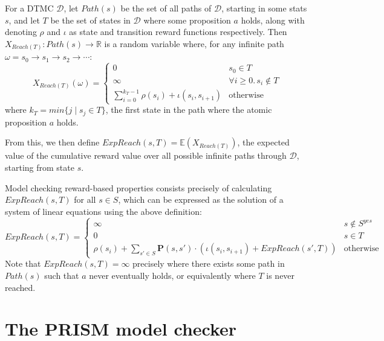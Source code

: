 \begin{definition}
\label{back:reach_reward}

For a DTMC $\mathcal{D}$, let $Path(s)$ be the set of all paths of $\mathcal{D}$, starting in some stats $s$, and let $T$ be the set of states in $\mathcal{D}$ where some proposition $a$ holds, along with denoting $\rho$ and $\iota$ as state and transition reward functions respectively. Then $X_{Reach(T)} : Path(s) \rightarrow \mathbb{R}$ is a random variable where, for any infinite path $\omega = s_{0} \rightarrow s_{1} \rightarrow s_{2} \rightarrow \cdots$:
    \begin{equation*} 
        X_{Reach(T)}(\omega) = 
            \begin{cases}
                0 & s_0 \in T \\
                \infty & \forall i \geq 0 . \, s_i \notin T  \\
                \sum_{i=0}^{k_{T} - 1} \rho(s_i) + \iota(s_i, s_{i+1}) & \text{otherwise}
            \end{cases}
    \end{equation*}
where $k_T = min \{ j \mid s_j \in T \}$, the first state in the path where the atomic proposition $a$ holds.

From this, we then define $ExpReach(s, T) = \mathbb{E}(X_{Reach(T)})$, the expected value of the cumulative reward value over all possible infinite paths through $\mathcal{D}$, starting from state $s$.

\end{definition}

Model checking reward-based properties consists precisely of calculating $ExpReach(s, T)$ for all $s \in S$,  which can be expressed as the solution of a system of linear equations using the above definition:
\begin{equation*}
    ExpReach(s, T) = 
        \begin{cases}
            \infty & s \not\in S^{yes} \\ 
            0 & s \in T \\
            \rho(s_i) + \sum_{s' \in S} \mathbf{P}(s, s') \cdot \left( \iota(s_i, s_{i+1}) + ExpReach(s', T) \right) & \text{otherwise}
        \end{cases}
\end{equation*}
Note that $ExpReach(s, T) = \infty$ precisely where there exists some path in $Path(s)$ such that $a$ never eventually holds, or equivalently where $T$ is never reached.

\section{The PRISM model checker}
\label{back:PRISM}

